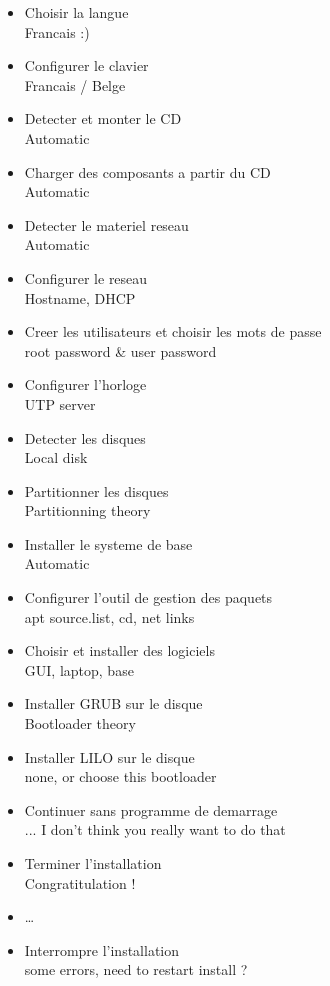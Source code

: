 \documentclass[a4paper,12pt]{book}
\begin{document}
\begin{itemize}
  	\item Choisir la langue \\ {\color{blue} Francais :)}
	\item Configurer le clavier \\ {\color{blue} Francais / Belge}
	\item Detecter et monter le CD \\ {\color{blue} Automatic}
	\item Charger des composants a partir du CD \\ {\color{blue} Automatic}
	\item Detecter le materiel reseau \\ {\color{blue} Automatic}
	\item Configurer le reseau \\ {\color{blue} Hostname, DHCP}
	\item Creer les utilisateurs et choisir les mots de passe \\ {\color{blue} root password \& user password}
	\item Configurer l'horloge \\ {\color{blue} UTP server}
	\item Detecter les disques \\ {\color{blue} Local disk}
	\item Partitionner les disques \\ {\color{blue} Partitionning theory}
	\item Installer le systeme de base \\ {\color{blue} Automatic}
	\item Configurer l'outil de gestion des paquets \\ {\color{blue} apt source.list, cd, net links}
	\item Choisir et installer des logiciels \\ {\color{blue} GUI, laptop, base}
	\item Installer GRUB sur le disque \\ {\color{blue} Bootloader theory}
	\item Installer LILO sur le disque \\ {\color{blue} none, or choose this bootloader}
	\item Continuer sans programme de demarrage \\ {\color{blue} ... I don't think you really want to do that}
	\item Terminer l'installation \\ {\color{blue} Congratitulation !}
	\item \ldots
	\item Interrompre l'installation \\ {\color{blue} some errors, need to restart install ?}
\end{itemize}
\end{document}
